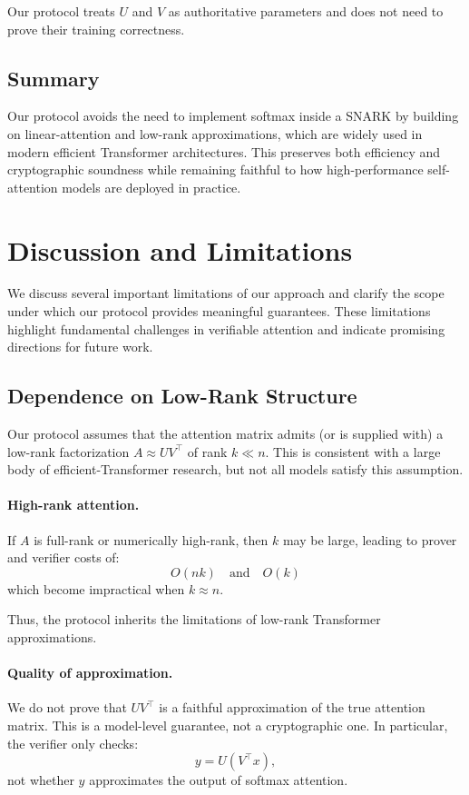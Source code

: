 \documentclass[11pt]{article}
\begin{document}
Our protocol treats $U$ and $V$ as authoritative parameters and does not
need to prove their training correctness.

\subsection{Summary}

Our protocol avoids the need to implement softmax inside a SNARK by
building on linear-attention and low-rank approximations, which are
widely used in modern efficient Transformer architectures.  
This preserves both efficiency and cryptographic soundness while
remaining faithful to how high-performance self-attention models are
deployed in practice.

\section{Discussion and Limitations}

We discuss several important limitations of our approach and clarify the
scope under which our protocol provides meaningful guarantees.  
These limitations highlight fundamental challenges in verifiable
attention and indicate promising directions for future work.

\subsection{Dependence on Low-Rank Structure}

Our protocol assumes that the attention matrix admits (or is supplied
with) a low-rank factorization $A \approx UV^\top$ of rank $k \ll n$.
This is consistent with a large body of efficient-Transformer research,
but not all models satisfy this assumption.

\paragraph{High-rank attention.}
If $A$ is full-rank or numerically high-rank, then $k$ may be large,
leading to prover and verifier costs of:
\[
  O(nk) \quad \text{and} \quad O(k)
\]
which become impractical when $k \approx n$.

Thus, the protocol inherits the limitations of low-rank Transformer
approximations.

\paragraph{Quality of approximation.}
We do not prove that $UV^\top$ is a faithful approximation of the true
attention matrix.  
This is a model-level guarantee, not a cryptographic one.  
In particular, the verifier only checks:
\[
  y = U(V^\top x),
\]
not whether $y$ approximates the output of softmax attention.
\end{document}
